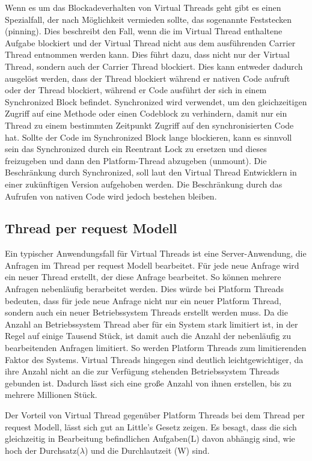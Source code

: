 \documentclass[fontsize=12pt,paper=a4,twoside=semi,parskip=half-,headsepline,headinclude]{scrreprt}
\begin{document}
Wenn es um das Blockadeverhalten von Virtual Threads geht gibt es einen Spezialfall, der nach Möglichkeit vermieden sollte, das sogenannte Feststecken (pinning). Dies beschreibt den Fall, wenn die im Virtual Thread enthaltene Aufgabe blockiert und der Virtual Thread nicht aus dem ausführenden Carrier Thread entnommen werden kann. Dies führt dazu, dass nicht nur der Virtual Thread, sondern auch der Carrier Thread blockiert. Dies kann entweder dadurch ausgelöst werden, dass der Thread blockiert während er nativen Code aufruft oder der Thread blockiert, während er Code ausführt der sich in einem Synchronized Block befindet. Synchronized wird verwendet, um den gleichzeitigen Zugriff auf eine Methode oder einen Codeblock zu verhindern, damit nur ein Thread zu einem bestimmten Zeitpunkt Zugriff auf den synchronisierten Code hat. Sollte der Code im Synchronized Block lange blockieren, kann es sinnvoll sein das Synchronized durch ein Reentrant Lock zu ersetzen und dieses freizugeben und dann den Platform-Thread abzugeben (unmount). Die Beschränkung durch Synchronized, soll laut den Virtual Thread Entwicklern in einer zukünftigen Version aufgehoben werden.\cite{Chilano2024} Die Beschränkung durch das Aufrufen von nativen Code wird jedoch bestehen bleiben.\cite{Bateman2024}

\subsection{Thread per request Modell}

Ein typischer Anwendungsfall für Virtual Threads ist eine Server-Anwendung, die Anfragen im Thread per request Modell bearbeitet. Für jede neue Anfrage wird ein neuer Thread erstellt, der diese Anfrage bearbeitet. So können mehrere Anfragen nebenläufig berarbeitet werden. Dies würde bei Platform Threads bedeuten, dass für jede neue Anfrage nicht nur ein neuer Platform Thread, sondern auch ein neuer Betriebssystem Threads erstellt werden muss. Da die Anzahl an Betriebssystem Thread aber für ein System stark limitiert ist, in der Regel auf einige Tausend Stück, ist damit auch die Anzahl der nebenläufig zu bearbeitenden Anfragen limitiert. So werden Platform Threads zum limitierenden Faktor des Systems. Virtual Threads hingegen sind deutlich leichtgewichtiger, da ihre Anzahl nicht an die zur Verfügung stehenden Betriebssystem Threads gebunden ist. Dadurch lässt sich eine große Anzahl von ihnen erstellen, bis zu mehrere Millionen Stück.

Der Vorteil von Virtual Thread gegenüber Platform Threads bei dem Thread per request Modell, lässt sich gut an Little's Gesetz zeigen. Es besagt, dass die sich gleichzeitig in Bearbeitung befindlichen Aufgaben(L) davon abhängig sind, wie hoch der Durchsatz($\lambda$) und die Durchlautzeit (W) sind.\cite{Little1961}
\end{document}
